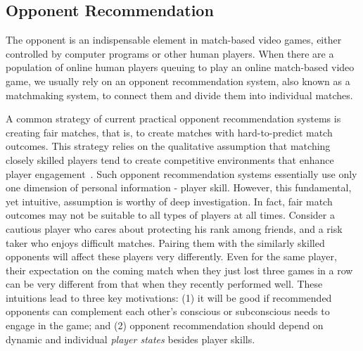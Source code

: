 



\subsection{Opponent Recommendation}

The opponent is an indispensable element in match-based video games, either controlled by computer programs or other human players. When there are a population of online human players queuing to play an online match-based video game, we usually rely on an opponent recommendation system, also known as a matchmaking system, to connect them and divide them into individual matches. 

A common strategy of current practical opponent recommendation systems is creating fair matches, that is, to create matches with hard-to-predict match outcomes. This strategy relies on the qualitative assumption that matching closely skilled players tend to create competitive environments that enhance player engagement~\cite{sweetser2005gameflow,flow1990psychology,chen2007flow,graepel2006ranking}. Such opponent recommendation systems essentially use only one dimension of personal information - player skill. However, this fundamental, yet intuitive, assumption is worthy of deep investigation. In fact, fair match outcomes may not be suitable to all types of players at all times. Consider a cautious player who cares about protecting his rank among friends, and a risk taker who enjoys difficult matches. Pairing them with the similarly skilled opponents will affect these players very differently. Even for the same player, their expectation on the coming match when they just lost three games in a row can be very different from that when they recently performed well. These intuitions lead to three key motivations: (1) it will be good if recommended opponents can complement each other's conscious or subconscious needs to engage in the game; and (2) opponent recommendation should depend on dynamic and individual \emph{player states} besides player skills.

